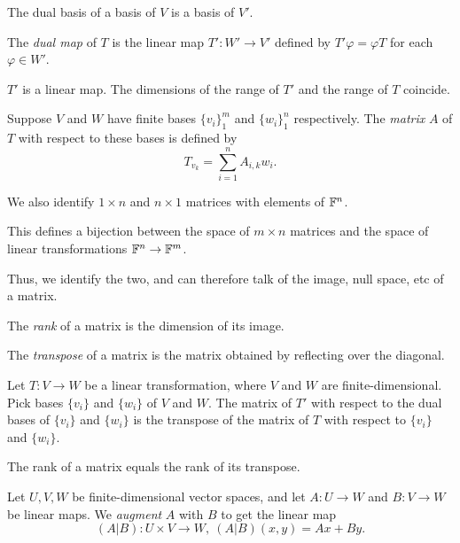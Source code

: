\begin{prop}
  The dual basis of a basis of $V$ is a basis of $V'$.
\end{prop}
\begin{defn}
  The \emph{dual map} of $T$ is the linear map $T':W'\to V'$ defined by
  $T'\varphi=\varphi T$ for each $\varphi\in W'$.
\end{defn}
\begin{prop}
  $T'$ is a linear map. The dimensions of the range of $T'$ and the range of $T$
  coincide.
\end{prop}
\begin{defn}
  Suppose $V$ and $W$ have finite bases $\{v_i\}_1^m$ and $\{w_i\}_1^n$
  respectively. The \emph{matrix} $A$ of $T$ with respect to these bases is
  defined by
  \[T_{v_k}=\sum_{i=1}^n A_{i,k}w_i.\]

  We also identify $1\times n$ and $n\times 1$ matrices with elements of
  $\mathbb{F}^n$.
\end{defn}
\begin{prop}
  This defines a bijection between the space of $m\times n$ matrices and the space
  of linear transformations $\mathbb{F}^n\to \mathbb{F}^m$.
\end{prop}
\begin{defn}
  Thus, we identify the two, and can therefore talk of the image, null space,
  etc of a matrix.
\end{defn}
\begin{defn}
  The \emph{rank} of a matrix is the dimension of its image.

  The \emph{transpose} of a matrix is the matrix obtained by reflecting over the
  diagonal.
\end{defn}
\begin{prop}
  Let $T:V\to W$ be a linear transformation, where $V$ and $W$ are
  finite-dimensional. Pick bases $\{v_i\}$ and $\{w_i\}$ 
  of $V$ and $W$. The matrix of $T'$ with respect
  to the dual bases of $\{v_i\}$ and $\{w_i\}$ 
  is the transpose of the matrix of $T$ with respect to $\{v_i\}$ and $\{w_i\}$.
\end{prop}
\begin{cor}
  The rank of a matrix equals the rank of its transpose.
\end{cor}
\begin{defn}
  Let $U,V,W$ be finite-dimensional vector spaces, and let $A:U\to W$ and
  $B:V\to W$ be linear maps. We \emph{augment} $A$ with $B$ to get the linear
  map
  \[(A|B):U\times V\to W,\ (A|B)(x,y)=Ax+By.\]
\end{defn}
